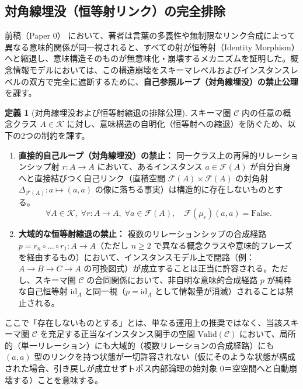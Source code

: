 \documentclass[11pt,a4paper]{ltjsarticle}
\theoremstyle{definition}
\newtheorem{definition}{定義}[section]
\theoremstyle{plain}
\theoremstyle{remark}
\newcommand{\Valid}{\mathrm{Valid}}
\newcommand{\id}{\mathrm{id}}
\begin{document}
\subsection{対角線埋没（恒等射リンク）の完全排除}
前稿（Paper 0）\cite{ota2026paper0} において、著者は言葉の多義性や無制限なリンク合成によって異なる意味的関係が同一視されると、すべての射が恒等射（Identity Morphism）へと縮退し、意味構造そのものが無意味化・崩壊するメカニズムを証明した。概念情報モデルにおいては、この構造崩壊をスキーマレベルおよびインスタンスレベルの双方で完全に遮断するために、\textbf{自己参照ループ（対角線埋没）の禁止公理}を課す。

\begin{definition}[対角線埋没および恒等射縮退の排除公理]\label{def:non-degeneracy}
スキーマ圏 $\mathcal{C}$ 内の任意の概念クラス $A \in \mathcal{K}$ に対し、意味構造の自明化（恒等射への縮退）を防ぐため、以下の2つの制約を課す。
\begin{enumerate}
    \item \textbf{直接的自己ループ（対角線埋没）の禁止：} 同一クラス上の再帰的リレーションシップ射 $r : A \to A$ において、あるインスタンス $a \in \mathcal{F}(A)$ が自分自身へと直接結びつく自己リンク（直積空間 $\mathcal{F}(A) \times \mathcal{F}(A)$ の対角射 $\Delta_{\mathcal{F}(A)} : a \mapsto (a, a)$ の像に落ちる事実）は構造的に存在しないものとする。
    \begin{equation}
    \forall A \in \mathcal{K},\; \forall r : A \to A,\; \forall a \in \mathcal{F}(A),\quad \mathcal{F}(\mu_r)(a, a) = \mathrm{False}.
    \end{equation}
    \item \textbf{大域的な恒等射縮退の禁止：} 複数のリレーションシップの合成経路 $p = r_n \circ \dots \circ r_1 : A \to A$（ただし $n \ge 2$ で異なる概念クラスや意味的フレーズを経由するもの）において、インスタンスモデル上で閉路（例：$A \to B \to C \to A$ の可換図式）が成立することは正当に許容される。ただし、スキーマ圏 $\mathcal{C}$ の合同関係において、非自明な意味的合成経路 $p$ が純粋な自己恒等射 $\id_A$ と同一視（$p = \id_A$ として情報量が消滅）されることは禁止される。
\end{enumerate}
\end{definition}

ここで「存在しないものとする」とは、単なる運用上の推奨ではなく、当該スキーマ圏 $\mathcal{C}$ を充足する正当なインスタンス関手の空間 $\Valid(\mathcal{C})$ において、局所的（単一リレーション）にも大域的（複数リレーションの合成経路）にも $(a, a)$ 型のリンクを持つ状態が一切許容されない（仮にそのような状態が構成された場合、引き戻しが成立せずトポス内部論理の始対象 $0$＝空空間へと自動崩壊する）ことを意味する。
\end{document}
